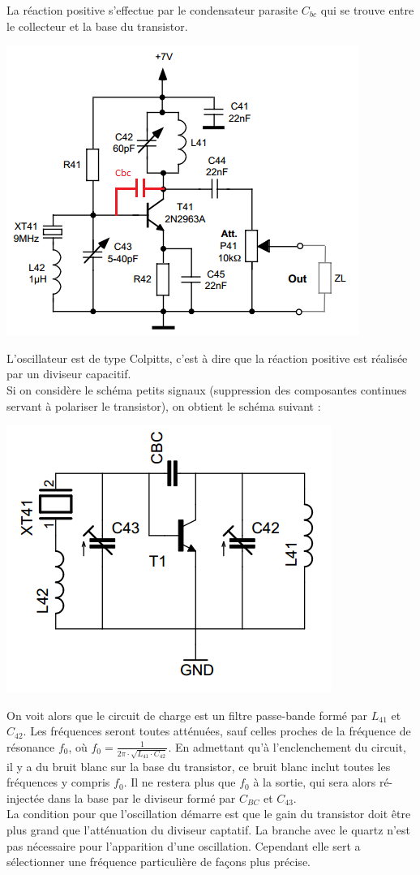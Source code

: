 \documentclass{article}
\begin{document}
La réaction positive s'effectue par le condensateur parasite $C_{bc}$ qui se trouve entre le collecteur et la base du transistor.
\begin{center}
\includegraphics[width = 0.7\linewidth]{shema_oscillateur.png}
\end{center}
L'oscillateur est de type Colpitts, c'est à dire que la réaction positive est réalisée par un diviseur capacitif.\\
Si on considère le schéma petits signaux (suppression des composantes continues servant à polariser le transistor), on obtient le schéma suivant :
\begin{center}
\includegraphics[width=0.4\linewidth]{shema_petit_signaux_oscillateur.png}
\end{center}
On voit alors que le circuit de charge est un filtre passe-bande formé par $L_{41}$ et $C_{42}$. Les fréquences seront toutes atténuées, sauf celles proches de la fréquence de résonance $f_0$, où $f_0 = \frac{1}{2 \pi \cdot \sqrt{L_{41} \cdot C_{42}}}$.
En admettant qu'à l'enclenchement du circuit, il y a du bruit blanc sur la base du transistor, ce bruit blanc inclut toutes les fréquences y compris $f_0$. Il ne restera plus que $f_0$ à la sortie, qui sera alors ré-injectée dans la base par le diviseur formé par $C_{BC}$ et $C_{43}$.\\
La condition pour que l'oscillation démarre est que le gain du transistor doit être plus grand que l'atténuation du diviseur captatif. La branche avec le quartz n'est pas nécessaire pour l'apparition d'une oscillation. Cependant elle sert a sélectionner une fréquence particulière de façons plus précise.
\end{document}
